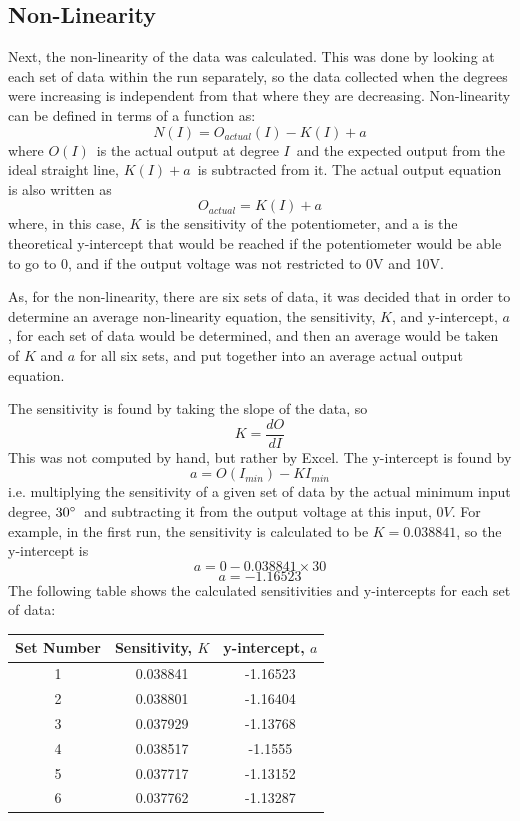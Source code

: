 \documentclass[a4,11pt]{article}
\begin{document}
\subsection{Non-Linearity}
Next, the non-linearity of the data was calculated. This was done by looking at each set of data within the run separately, so the data collected when the degrees were increasing is independent from that where they are decreasing.
Non-linearity can be defined in terms of a function as:
$$N(I)=O_{actual}(I)-K(I)+a$$
where $O(I)$\ is the actual output at degree $I$\ and the expected output from the ideal straight line, $K(I)+a$\ is subtracted from it. The actual output equation is also written as
$$O_{actual}=K(I)+a$$
where, in this case, $K$ is the sensitivity of the potentiometer, and a is the theoretical y-intercept that would be reached if the potentiometer would be able to go to 0\degree, and if the output voltage was not restricted to 0V and 10V.

As, for the non-linearity, there are six sets of data, it was decided that in order to determine an average non-linearity equation, the sensitivity, $K$, and y-intercept, $a$, for each set of data would be determined, and then an average would be taken of $K$ and $a$ for all six sets, and put together into an average actual output equation.

The sensitivity is found by taking the slope of the data, so
$$K=\frac{dO}{dI}$$
This was not computed by hand, but rather by Excel. The y-intercept is found by
$$a=O(I_{min})-KI_{min}$$
i.e. multiplying the sensitivity of a given set of data by the actual minimum input degree, $30\degree$\ and subtracting it from the output voltage at this input, $0V$. For example, in the first run, the sensitivity is calculated to be $K=0.038841$, so the y-intercept is
$$a=0-0.038841\times30$$
$$a=-1.16523$$
The following table shows the calculated sensitivities and y-intercepts for each set of data:
\begin{center}
	\begin{tabular}{c|c|c}
		Set Number & Sensitivity, $K$ & y-intercept, $a$ \\
		\hline
		1 & 0.038841 & -1.16523 \\
		2 & 0.038801 & -1.16404 \\
		3 & 0.037929 & -1.13768 \\
		4 & 0.038517 & -1.1555 \\
		5 & 0.037717 & -1.13152 \\
		6 & 0.037762 & -1.13287 \\
		\hline
	\end{tabular}
\end{center}
\end{document}
